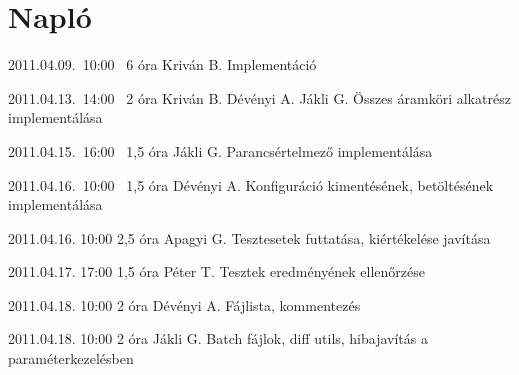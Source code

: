 %
\section{Napló}

\begin{naplo}

\bejegyzes
{2011.04.09.~10:00~} %
{6 óra} %
{Kriván B.} %
{Implementáció} %

\bejegyzes
{2011.04.13.~14:00~} %
{2 óra} %
{Kriván B.
Dévényi A.
Jákli G.} %
{Összes áramköri alkatrész implementálása} %

{2011.04.15.~16:00~} %
{1,5 óra} %
{Jákli G.} %
{Parancsértelmező implementálása} %

{2011.04.16.~10:00~} %
{1,5 óra} %
{Dévényi A.} %
{Konfiguráció kimentésének, betöltésének implementálása} %

\bejegyzes
{2011.04.16. 10:00} %
{2,5 óra} %
{Apagyi G.} %
{Tesztesetek futtatása, kiértékelése javítása} %

\bejegyzes
{2011.04.17. 17:00} %
{1,5 óra} %
{Péter T.} %
{Tesztek eredményének ellenőrzése} %

\bejegyzes
{2011.04.18. 10:00} %
{2 óra} %
{Dévényi A.} %
{Fájlista, kommentezés} %

\bejegyzes
{2011.04.18. 10:00} %
{2 óra} %
{Jákli G.} %
{Batch fájlok, diff utils, hibajavítás a paraméterkezelésben} %


\end{naplo}

